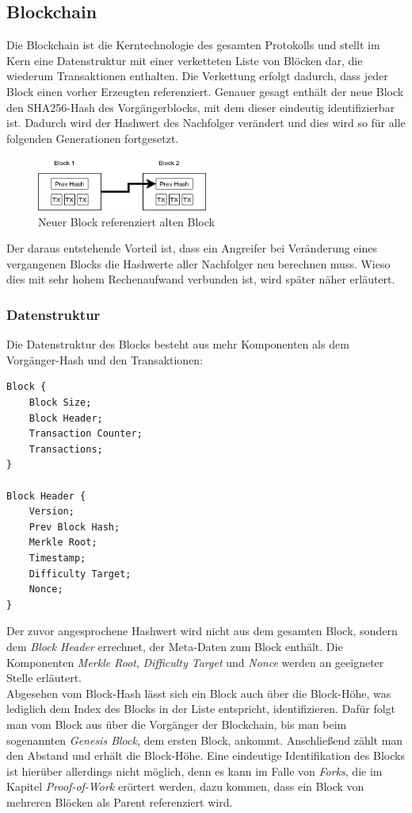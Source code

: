 \subsection{Blockchain}
Die Blockchain ist die Kerntechnologie des gesamten Protokolls und stellt im Kern eine Datenstruktur mit einer verketteten Liste von Blöcken dar, die wiederum Transaktionen enthalten. 
Die Verkettung erfolgt dadurch, dass jeder Block einen vorher Erzeugten referenziert. 
Genauer gesagt enthält der neue Block den SHA256-Hash des Vorgängerblocks, mit dem dieser eindeutig identifizierbar ist. Dadurch wird der Hashwert des Nachfolger verändert und dies wird so für alle folgenden Generationen fortgesetzt.
\begin{figure}[htpb]
	\centering
	\includegraphics[width=0.5\textwidth]{images/chain.png}
	\caption{Neuer Block referenziert alten Block}
	\label{6braun:fig:chain}
\end{figure}
Der daraus entstehende Vorteil ist, dass ein Angreifer bei Veränderung eines vergangenen Blocks die Hashwerte aller Nachfolger neu berechnen muss. Wieso dies mit sehr hohem Rechenaufwand verbunden ist, wird später näher erläutert.

\subsubsection{Datenstruktur}
Die Datenstruktur des Blocks besteht aus mehr Komponenten als dem Vorgänger-Hash und den Transaktionen:
\begin{lstlisting}[mathescape, caption={Datenstruktur des Blocks},captionpos=b]
Block {
	Block Size;
	Block Header;
	Transaction Counter;
	Transactions;
}

Block Header {
	Version;
	Prev Block Hash;
	Merkle Root;
	Timestamp;
	Difficulty Target;
	Nonce;
}
\end{lstlisting}
Der zuvor angesprochene Hashwert wird nicht aus dem gesamten Block, sondern dem \emph{Block Header} errechnet, der Meta-Daten zum Block enthält. Die Komponenten \emph{Merkle Root}, \emph{Difficulty Target} und \emph{Nonce} werden an geeigneter Stelle erläutert.\\
Abgesehen vom Block-Hash lässt sich ein Block auch über die Block-Höhe, was lediglich dem Index des Blocks in der Liste entspricht, identifizieren. 
Dafür folgt man vom Block aus über die Vorgänger der Blockchain, bis man beim sogenannten \emph{Genesis Block}, dem ersten Block, ankommt. 
Anschließend zählt man den Abstand und erhält die Block-Höhe.
Eine eindeutige Identifikation des Blocks ist hierüber allerdings nicht möglich, denn es kann im Falle von \emph{Forks}, die im Kapitel \emph{Proof-of-Work} erörtert werden, dazu kommen, dass ein Block von mehreren Blöcken als Parent referenziert wird.\\
